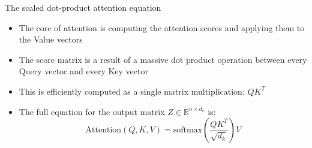 \documentclass[aspectratio=169]{beamer}\usepackage[]{graphicx}\usepackage[]{xcolor}
\begin{document}
\begin{frame}{The scaled dot-product attention equation}
\begin{itemize}
\item The core of attention is computing the attention scores and applying them to the Value vectors
\vfill
\item The score matrix is a result of a massive dot product operation between every Query vector and every Key vector
\vfill
\item This is efficiently computed as a single matrix multiplication: $QK^T$
\vfill
\item The full equation for the output matrix $Z \in \mathbb{R}^{n \times d_v}$ is:
$$ \text{Attention}(Q, K, V) = \text{softmax}\left(\frac{QK^T}{\sqrt{d_k}}\right)V $$
\end{itemize}
\end{frame}
\end{document}
